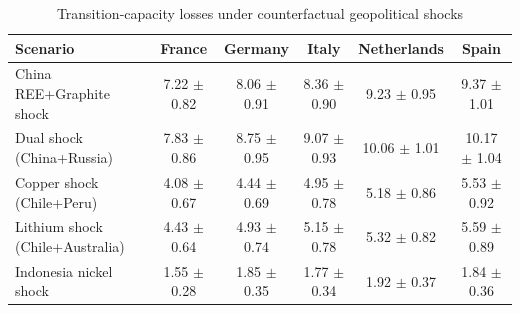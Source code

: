 \begin{table}[t]
\centering
\caption{Transition-capacity losses under counterfactual geopolitical shocks}
\label{tab:counterfactual_losses_v7}
\small
\begin{tabular}{lccccc}
\toprule
Scenario & France & Germany & Italy & Netherlands & Spain \\
\midrule
China REE+Graphite shock & 7.22 $\pm$ 0.82 & 8.06 $\pm$ 0.91 & 8.36 $\pm$ 0.90 & 9.23 $\pm$ 0.95 & 9.37 $\pm$ 1.01 \\
Dual shock (China+Russia) & 7.83 $\pm$ 0.86 & 8.75 $\pm$ 0.95 & 9.07 $\pm$ 0.93 & 10.06 $\pm$ 1.01 & 10.17 $\pm$ 1.04 \\
Copper shock (Chile+Peru) & 4.08 $\pm$ 0.67 & 4.44 $\pm$ 0.69 & 4.95 $\pm$ 0.78 & 5.18 $\pm$ 0.86 & 5.53 $\pm$ 0.92 \\
Lithium shock (Chile+Australia) & 4.43 $\pm$ 0.64 & 4.93 $\pm$ 0.74 & 5.15 $\pm$ 0.78 & 5.32 $\pm$ 0.82 & 5.59 $\pm$ 0.89 \\
Indonesia nickel shock & 1.55 $\pm$ 0.28 & 1.85 $\pm$ 0.35 & 1.77 $\pm$ 0.34 & 1.92 $\pm$ 0.37 & 1.84 $\pm$ 0.36 \\
\bottomrule
\end{tabular}
\end{table}